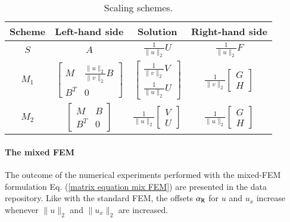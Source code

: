 \documentclass[review,3p]{elsarticle}
\begin{document}
\begin{table}[!ht]
\centering
\caption [sss] {Scaling schemes.}
\label{scaling schemes std and mix FEM} 
\begin{tabular}{c c c c}
\hline  
{Scheme}& Left-hand side & Solution & Right-hand side \\	\hline
$S$ & {$A$} & $\frac{1}{\|u\|_{2}} U$ & $\frac{1}{\|u\|_{2}} F$ \\	\hline
$M_1$ & {$\left[ \begin{array}{cc} M & \frac{\|u\|_{2}}{\|v\|_{2}} B  \\ B^T & 0 \end{array}\right]$ } & $\left[ \begin{array}{cc} \frac{1}{\|v\|_{2}} {V} \\ \frac{1}{\|u\|_{2}} {U} \end{array}\right]$ & $\frac{1}{\|v\|_{2}} \left[ \begin{array}{cc} G \\ H \end{array}\right]$\\	\hline
$M_2$ & {$\left[ \begin{array}{cc} M & B  \\ B^T & 0 \end{array}\right]$ } & $\frac{1}{\|u\|_{2}} \left[ \begin{array}{cc} {V} \\ {U} \end{array}\right]$ & $\frac{1}{\|u\|_{2}} \left[ \begin{array}{cc}  G \\ H \end{array}\right]$ \\	\hline
\end{tabular}
\end{table}


\paragraph{The mixed FEM}			\label{scaling_mix_FEM}

The outcome of the numerical experiments performed with the mixed-FEM formulation Eq. (\ref{matrix equation mix FEM}) are presented in the data repository.
Like with the standard FEM, the offsets $\alpha_{\rm R}$ for $u$ and $u_x$ increase whenever $\|u\|_2$ and $\|u_x\|_2$ are increased.
\end{document}
